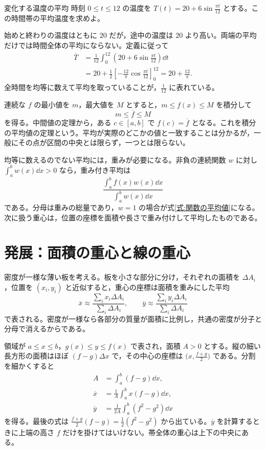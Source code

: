 \begin{example}{変化する温度の平均}
時刻 $0\leq t\leq12$ の温度を $T(t)=20+6\sin\frac{\pi t}{12}$ とする。この時間帯の平均温度を求めよ。
\end{example}

始めと終わりの温度はともに $20$ だが，途中の温度は $20$ より高い。両端の平均だけでは時間全体の平均にならない。定義に従って
\[
\begin{aligned}
\overline T
 &=\frac1{12}\int_0^{12}\left(20+6\sin\frac{\pi t}{12}\right)\dd t\\
 &=20+\frac12\left[-\frac{12}{\pi}\cos\frac{\pi t}{12}\right]_0^{12}
 =20+\frac{12}{\pi}.
\end{aligned}
\]
全時間を均等に数えて平均を取っていることが，$\frac1{12}$ に表れている。

連続な $f$ の最小値を $m$，最大値を $M$ とすると，$m\leq f(x)\leq M$ を積分して
\[
m\leq\overline f\leq M
\]
を得る。中間値の定理から，ある $c\in[a,b]$ で $f(c)=\overline f$ となる。これを積分の平均値の定理という。平均が実際のどこかの値と一致することは分かるが，一般にその点が区間の中央とは限らず，一つとは限らない。

均等に数えるのでない平均には，重みが必要になる。非負の連続関数 $w$ に対し $\int_a^b w(x)\dd x>0$ なら，重み付き平均は
\[
\frac{\int_a^b f(x)w(x)\dd x}{\int_a^b w(x)\dd x}
\]
である。分母は重みの総量であり，$w=1$ の場合が式\eqref{式:関数の平均値}になる。次に扱う重心は，位置の座標を面積や長さで重み付けして平均したものである。

\section{発展：面積の重心と線の重心}\label{節:面積重心と線重心}

密度が一様な薄い板を考える。板を小さな部分に分け，それぞれの面積を $\Delta A_i$，位置を $(x_i,y_i)$ と近似すると，重心の座標は面積を重みにした平均
\[
\overline x\approx\frac{\sum_i x_i\Delta A_i}{\sum_i\Delta A_i},\qquad
\overline y\approx\frac{\sum_i y_i\Delta A_i}{\sum_i\Delta A_i}
\]
で表される。密度が一様なら各部分の質量が面積に比例し，共通の密度が分子と分母で消えるからである。

領域が $a\leq x\leq b$，$g(x)\leq y\leq f(x)$ で表され，面積 $A>0$ とする。縦の細い長方形の面積はほぼ $(f-g)\Delta x$ で，その中心の座標は $\bigl(x,\frac{f+g}{2}\bigr)$ である。分割を細かくすると
\begin{equation}\label{式:面積の重心}
\begin{aligned}
A&=\int_a^b(f-g)\dd x,\\
\overline x&=\frac1A\int_a^b x(f-g)\dd x,\\
\overline y&=\frac1{2A}\int_a^b(f^2-g^2)\dd x
\end{aligned}
\end{equation}
を得る。最後の式は $\frac{f+g}{2}(f-g)=\frac12(f^2-g^2)$ から出ている。$\overline y$ を計算するときに上端の高さ $f$ だけを掛けてはいけない。帯全体の重心は上下の中央にある。

